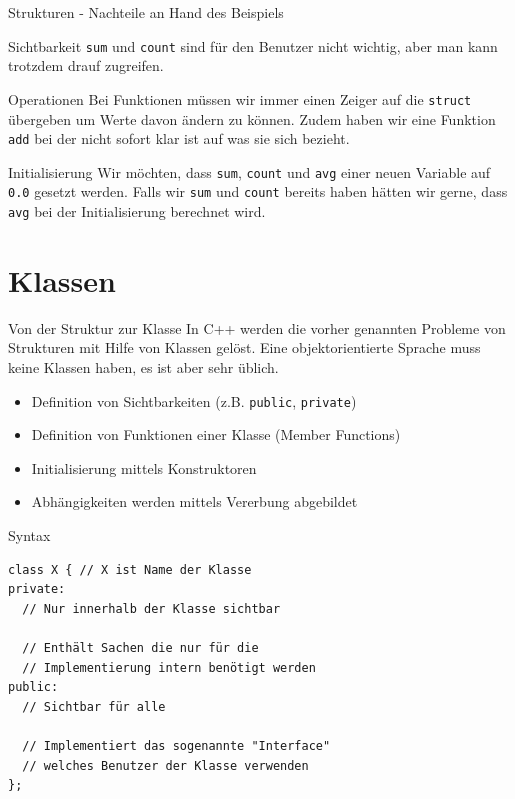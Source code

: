 \documentclass[presentation]{beamer}
\begin{document}
\begin{frame}[fragile,label={sec:orgf8af785}]{Strukturen - Nachteile an Hand des Beispiels}
 \begin{block}{Sichtbarkeit}
{\color{solarizedYellow}\texttt{sum} }und {\color{solarizedYellow}\texttt{count} }sind für den Benutzer nicht wichtig, aber man kann
trotzdem drauf zugreifen.
\end{block}
\begin{block}{Operationen}
Bei Funktionen müssen wir immer einen Zeiger auf die {\color{solarizedYellow}\texttt{struct}}
übergeben um Werte davon ändern zu können. Zudem haben wir eine
Funktion {\color{solarizedYellow}\texttt{add} }bei der nicht sofort klar ist auf was sie sich
bezieht.
\end{block}
\begin{block}{Initialisierung}
Wir möchten, dass {\color{solarizedYellow}\texttt{sum}}, {\color{solarizedYellow}\texttt{count} }und {\color{solarizedYellow}\texttt{avg} }einer neuen Variable auf
{\color{solarizedYellow}\texttt{0.0} }gesetzt werden. Falls wir {\color{solarizedYellow}\texttt{sum} }und {\color{solarizedYellow}\texttt{count} }bereits haben
hätten wir gerne, dass {\color{solarizedYellow}\texttt{avg} }bei der Initialisierung berechnet wird.
\end{block}
\end{frame}
\section{Klassen}
\label{sec:org3a2a0f4}
\begin{frame}[fragile,label={sec:org94578c9}]{Von der Struktur zur Klasse}
 In C++ werden die vorher genannten Probleme von Strukturen mit Hilfe
von \alert{Klassen} gelöst. Eine objektorientierte Sprache muss keine
Klassen haben, es ist aber sehr üblich.
\begin{itemize}
\item Definition von Sichtbarkeiten (z.B. {\color{solarizedYellow}\texttt{public}}, {\color{solarizedYellow}\texttt{private}})
\item Definition von Funktionen einer Klasse (\alert{Member Functions})
\item Initialisierung mittels \alert{Konstruktoren}
\item Abhängigkeiten werden mittels \alert{Vererbung} abgebildet
\end{itemize}
\begin{block}{Syntax}
\begin{verbatim}
class X { // X ist Name der Klasse
private:
  // Nur innerhalb der Klasse sichtbar

  // Enthält Sachen die nur für die 
  // Implementierung intern benötigt werden
public:
  // Sichtbar für alle

  // Implementiert das sogenannte "Interface"
  // welches Benutzer der Klasse verwenden
};
\end{verbatim}
\end{block}
\end{frame}
\end{document}

